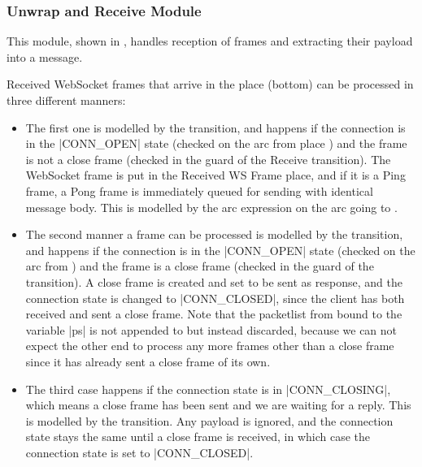 	\subsubsection{Unwrap and Receive Module}
		
		
		This module, shown in , handles reception of
		frames and extracting their payload into a message.
		
		Received WebSocket frames that arrive in the  place 
		(bottom) can be processed in three different manners:
		
		\begin{itemize}
			\item The first one is modelled by the  transition, and
			happens if the connection is in the |CONN_OPEN| state (checked on the arc
			from place ) and the frame is not a close frame
			(checked in the guard of the Receive transition). The WebSocket frame is put
			in the Received WS Frame place, and if it is a Ping frame, a Pong frame is
			immediately queued for sending with identical message body. This is modelled
			by the arc expression on the arc going to .
			
			\item The second manner a frame can be processed is modelled by the
			 transition, and happens if the connection is in the
			|CONN_OPEN| state (checked on the arc from ) and the frame is a close frame (checked in the guard of the  transition). A close frame is
			created and set to be sent as response, and the connection state is changed
			to |CONN_CLOSED|, since the client has both received and sent a close
			frame. Note that the packetlist from  bound to the
			variable |ps| is not appended to but instead discarded, because we can not
			expect the other end to process any more frames other than a close frame
			since it has already sent a close frame of its own.
			
			\item The third case happens if the connection state is in
			|CONN_CLOSING|, which means a close frame has been sent and we are
			waiting for a reply. This is modelled by the 
			transition. Any payload is ignored, and the connection state stays the same
			until a close frame is received, in which case the connection state is set to |CONN_CLOSED|. 
		\end{itemize}
		
